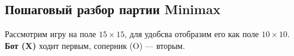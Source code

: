 





\tableofcontents
\newpage








\subsection{Пошаговый разбор партии Minimax}

Рассмотрим игру на поле $15\times15$, для удобсва отобразим его как поле $10\times10$. \textbf{Бот (X)} ходит первым, соперник (O) --- вторым.











